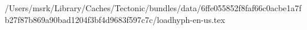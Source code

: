 /Users/msrk/Library/Caches/Tectonic/bundles/data/6ffe055852f8faf66c0acbe1a7fb27f87b869a90bad1204f3bf4d9683f597c7c/loadhyph-en-us.tex